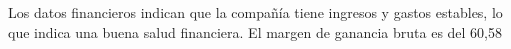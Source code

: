 

Los datos financieros indican que la compañía tiene ingresos y gastos estables, lo que indica una buena salud financiera. El margen de ganancia bruta es del 60,58%